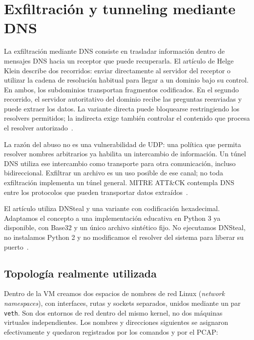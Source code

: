 \documentclass[11pt,a4paper]{article}
\begin{document}
\section{Exfiltración y tunneling mediante DNS}

La exfiltración mediante DNS consiste en trasladar información dentro de
mensajes DNS hacia un receptor que puede recuperarla. El artículo de Helge
Klein describe dos recorridos: enviar directamente al servidor del receptor
o utilizar la cadena de resolución habitual para llegar a un dominio bajo
su control. En ambos, los subdominios transportan fragmentos codificados.
En el segundo recorrido, el servidor autoritativo del dominio recibe las
preguntas reenviadas y puede extraer los datos. La variante directa puede
bloquearse restringiendo los resolvers permitidos; la indirecta exige también
controlar el contenido que procesa el resolver autorizado~\cite{klein}.

La razón del abuso no es una vulnerabilidad de UDP: una política que permita
resolver nombres arbitrarios ya habilita un intercambio de información. Un
túnel DNS utiliza ese intercambio como transporte para otra comunicación,
incluso bidireccional. Exfiltrar un archivo es un uso posible de ese canal;
no toda exfiltración implementa un túnel general. MITRE ATT\&CK contempla DNS
entre los protocolos que pueden transportar datos extraídos~\cite{mitre}.

El artículo utiliza DNSteal y una variante con codificación hexadecimal.
Adaptamos el concepto a una implementación educativa en Python 3 ya disponible,
con Base32 y un único archivo sintético fijo. No ejecutamos DNSteal, no
instalamos Python 2 y no modificamos el resolver del sistema para liberar su
puerto~\cite{klein}.

\subsection{Topología realmente utilizada}

Dentro de la VM creamos dos espacios de nombres de red Linux
(\emph{network namespaces}), con interfaces, rutas y sockets separados,
unidos mediante un par \texttt{veth}. Son dos entornos de red dentro del
mismo kernel, no dos máquinas virtuales independientes. Los nombres y
direcciones siguientes se asignaron efectivamente y quedaron registrados
por los comandos y por el PCAP:

\begin{center}
\end{center}
\end{document}
